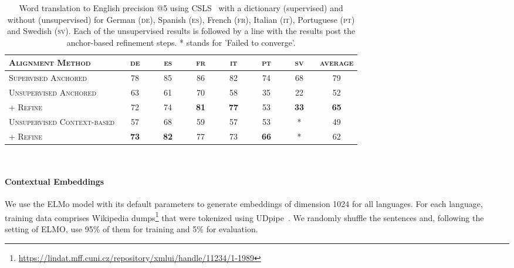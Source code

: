 \documentclass[11pt,a4paper]{article}
\begin{document}
\begin{table*}[t!]
\centering
\begin{tabular}{l|cccccc|c}
\toprule
\textsc{Alignment Method}       & \textsc{de}    & \textsc{es}    & \textsc{fr}    & \textsc{it}    & \textsc{pt}    & \textsc{sv}    & \textsc{average} \\ \midrule
\textsc{Supervised Anchored}                     & \ \ 78\ \  & \ \ 85\ \  & \ \ 86\ \  & \ \ 82\ \  & \ \ 74\ \  & \ \ 68\ \  &  \ \ 79\ \    \\ \midrule

\textsc{Unsupervised Anchored}  & 63 & 61 & 70 & 58 & 35 & 22 &   52  \\ \hspace{22mm} \textsc{ + Refine}                 & 72 & 74 & \textbf{81} & \textbf{77} & 53 & \textbf{33} &  \textbf{65}   \\ 

\textsc{Unsupervised Context-based} & 57 & 68 & 59 & 57 & 53 & * &   49  \\ \hspace{22mm} \textsc{ + Refine} & \textbf{73} & \textbf{82} & 77     & 73 & \textbf{66}     & *   & 62    \\ \bottomrule
\end{tabular}\\
\caption{Word translation to English precision @5 using CSLS~\cite{conneau2017word} with a dictionary (supervised) and without (unsupervised) for German (\textsc{de}), Spanish (\textsc{es}), French (\textsc{fr}), Italian (\textsc{it}), Portuguese (\textsc{pt}) and Swedish (\textsc{sv}). Each of the unsupervised results is followed by a line with the results post the anchor-based refinement steps.  * stands for 'Failed to converge'. }\label{tab:align}
\end{table*}



\paragraph{Contextual Embeddings}
We use the ELMo model \cite{peters_deep_2018} with its default parameters to generate embeddings of dimension 1024 for all languages. For each language, training data comprises Wikipedia dumps\footnote{\url{https://lindat.mff.cuni.cz/repository/xmlui/handle/11234/1-1989}} that were tokenized using UDpipe~\cite{udpipe_2017}. We randomly shuffle the sentences and, following the setting of ELMO, use 95\% of them for training and 5\% for evaluation.
\end{document}
